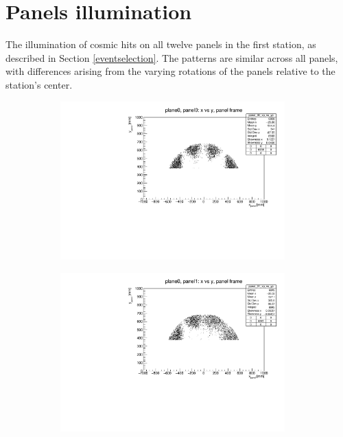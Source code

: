 \chapter{Panels illumination}\label{appendix1}
The illumination of cosmic hits on all twelve panels in the first station, as described in Section \ref{eventselection}. 
The patterns are similar across all panels, with differences arising from the varying rotations of the panels relative to the station's center.
\begin{figure}[!h]
    \centering
    \begin{subfigure}[b]{0.4\textwidth}
        \centering
        \includegraphics[width=0.95\textwidth]{figures/pdf/plane0_panel0_x_vs_y_all.pdf}
        \label{fig:panel0plane0}
    \end{subfigure}
    \hfill
    \begin{subfigure}[b]{0.4\textwidth}
        \centering
        \includegraphics[width=0.95\textwidth]{figures/pdf/plane0_panel1_x_vs_y_all.pdf}

\end{subfigure}
\end{figure}
